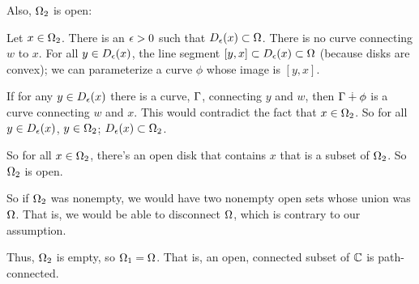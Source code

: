 \documentclass[a4paper,12pt]{article}
\begin{document}
Also, $\Omega_2$ is open: 

\tab Let $x \in \Omega_2$. There is an $\epsilon>0$ such that $D_\epsilon(x) \subset \Omega$. There is no curve connecting $w$ to $x$. For all $y \in D_\epsilon(x)$, the line segment $[y,x] \subset D_\epsilon(x) \subset \Omega$ (because disks are convex); we can parameterize a curve $\phi$ whose image is $[y,x]$. 

\tab If for any $y \in D_\epsilon(x)$ there is a curve, $\Gamma$, connecting $y$ and $w$, then $\Gamma \dotplus \phi$ is a curve connecting $w$ and $x$. This would contradict the fact that $x \in \Omega_2$. So for all $y \in D_\epsilon(x)$, $y \in \Omega_2$; $D_\epsilon(x) \subset \Omega_2$.

\tab So for all $x \in \Omega_2$, there's an open disk that contains $x$ that is a subset of $\Omega_2$. So $\Omega_2$ is open.

So if $\Omega_2$ was nonempty, we would have two nonempty open sets whose union was $\Omega$. That is, we would be able to disconnect $\Omega$, which is contrary to our assumption.

Thus, $\Omega_2$ is empty, so $\Omega_1=\Omega$. That is, an open, connected subset of $\mathbb{C}$ is path-connected.

\shunt
\end{document}
